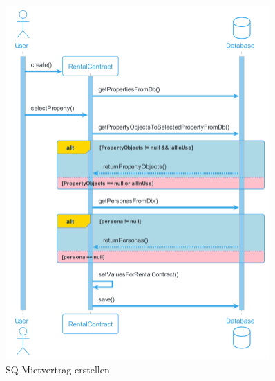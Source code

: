 \begin{figure}[H]
  \begin{center}
    \includegraphics[width=0.9\textwidth]{content/diagrams/out/sequenzdiagram/mietvertrag/mietvertrag.png}
    \caption{SQ-Mietvertrag erstellen}
    \label{sqMietvertragCreate}
  \end{center}
\end{figure}

